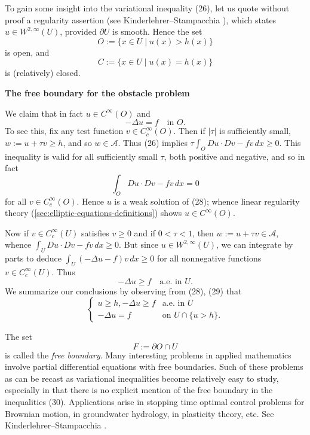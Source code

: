 \begin{remark}
\label{rem:obstacle-problem-free-boundary-interpretation}
To gain some insight into the variational inequality (26), let us quote without proof a regularity assertion (see Kinderlehrer--Stampacchia \cite{KinderlehrerStampacchia1980}), which states $u \in W^{2,\infty}(U)$, provided $\partial U$ is smooth. Hence the set
\[
O := \{x \in U \mid u(x) > h(x)\}
\]
is open, and
\[
C := \{x \in U \mid u(x) = h(x)\}
\]
is (relatively) closed.

\begin{figure}[h]\centering
\end{figure}
\noindent\textbf{The free boundary for the obstacle problem}

We claim that in fact $u \in C^\infty(O)$ and
\[
-\Delta u = f \quad \text{in } O.
\tag{28}
\]
To see this, fix any test function $v \in C_c^\infty(O)$. Then if $|\tau|$ is sufficiently small, $w := u + \tau v \geq h$, and so $w \in \mathcal{A}$. Thus (26) implies $\tau \int_O Du \cdot Dv - fv\, dx \geq 0$. This inequality is valid for all sufficiently small $\tau$, both positive and negative, and so in fact
\[
\int_O Du \cdot Dv - fv\, dx = 0
\]
for all $v \in C_c^\infty(O)$. Hence $u$ is a weak solution of (28); whence linear regularity theory (\cref{sec:elliptic-equations-definitions}) shows $u \in C^\infty(O)$.

Now if $v \in C_c^\infty(U)$ satisfies $v \geq 0$ and if $0 < \tau < 1$, then $w := u+\tau v \in \mathcal{A}$, whence $\int_U Du \cdot Dv - fv\, dx \geq 0$. But since $u \in W^{2,\infty}(U)$, we can integrate by parts to deduce $\int_U (-\Delta u - f)v\, dx \geq 0$ for all nonnegative functions $v \in C_c^\infty(U)$. Thus
\[
-\Delta u \geq f \quad \text{a.e. in } U.
\tag{29}
\]
We summarize our conclusions by observing from (28), (29) that
\[
\begin{cases} u \geq h, -\Delta u \geq f & \text{a.e. in } U \\ -\Delta u = f & \text{on } U \cap \{u > h\}. \end{cases}
\tag{30}
\]

The set
\[
F := \partial O \cap U
\]
is called the \textit{free boundary}. Many interesting problems in applied mathematics involve partial differential equations with free boundaries. Such of these problems as can be recast as variational inequalities become relatively easy to study, especially in that there is no explicit mention of the free boundary in the inequalities (30). Applications arise in stopping time optimal control problems for Brownian motion, in groundwater hydrology, in plasticity theory, etc. See Kinderlehrer--Stampacchia \cite{KinderlehrerStampacchia1980}.
\end{remark}


